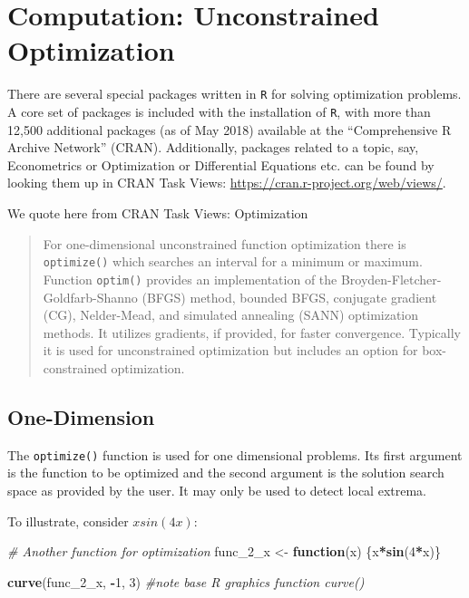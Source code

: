 \documentclass[11pt,]{article}
\newenvironment{Shaded}{\begin{snugshade}}{\end{snugshade}}
\newcommand{\KeywordTok}[1]{\textcolor[rgb]{0.13,0.29,0.53}{\textbf{#1}}}
\newcommand{\DecValTok}[1]{\textcolor[rgb]{0.00,0.00,0.81}{#1}}
\newcommand{\StringTok}[1]{\textcolor[rgb]{0.31,0.60,0.02}{#1}}
\newcommand{\CommentTok}[1]{\textcolor[rgb]{0.56,0.35,0.01}{\textit{#1}}}
\newcommand{\ControlFlowTok}[1]{\textcolor[rgb]{0.13,0.29,0.53}{\textbf{#1}}}
\newcommand{\OperatorTok}[1]{\textcolor[rgb]{0.81,0.36,0.00}{\textbf{#1}}}
\newcommand{\NormalTok}[1]{#1}
\begin{document}
\section{Computation: Unconstrained
Optimization}\label{computation-unconstrained-optimization}

There are several special packages written in \texttt{R} for solving
optimization problems. A core set of packages is included with the
installation of \texttt{R}, with more than 12,500 additional packages
(as of May 2018) available at the ``Comprehensive R Archive Network''
(CRAN). Additionally, packages related to a topic, say, Econometrics or
Optimization or Differential Equations etc. can be found by looking them
up in CRAN Task Views: \url{https://cran.r-project.org/web/views/}.

We quote here from CRAN Task Views: Optimization

\begin{quote}
For one-dimensional unconstrained function optimization there is
\texttt{optimize()} which searches an interval for a minimum or maximum.
Function \texttt{optim()} provides an implementation of the
Broyden-Fletcher-Goldfarb-Shanno (BFGS) method, bounded BFGS, conjugate
gradient (CG), Nelder-Mead, and simulated annealing (SANN) optimization
methods. It utilizes gradients, if provided, for faster convergence.
Typically it is used for unconstrained optimization but includes an
option for box-constrained optimization.
\end{quote}

\subsection{One-Dimension}\label{one-dimension}

The \texttt{optimize()} function is used for one dimensional problems.
Its first argument is the function to be optimized and the second
argument is the solution search space as provided by the user. It may
only be used to detect local extrema.

To illustrate, consider \(xsin(4x)\):

\begin{Shaded}
\begin{Highlighting}[]
\CommentTok{# Another function for optimization}
\NormalTok{func_2_x <-}\StringTok{ }\ControlFlowTok{function}\NormalTok{(x) \{x}\OperatorTok{*}\KeywordTok{sin}\NormalTok{(}\DecValTok{4}\OperatorTok{*}\NormalTok{x)\}}

\KeywordTok{curve}\NormalTok{(func_2_x, }\OperatorTok{-}\DecValTok{1}\NormalTok{, }\DecValTok{3}\NormalTok{) }\CommentTok{#note base R graphics function curve()}
\end{Highlighting}
\end{Shaded}
\end{document}
